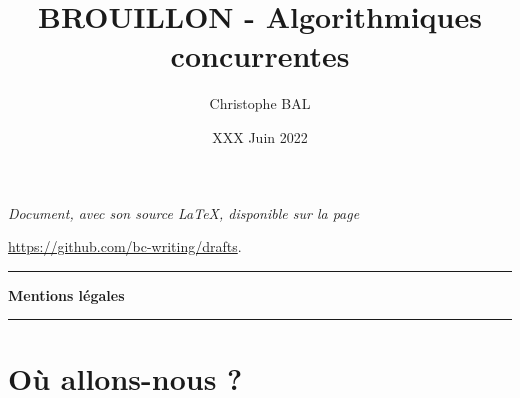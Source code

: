 \documentclass{amsbook}
\begin{document}
\title{BROUILLON - Algorithmiques concurrentes}
\author{Christophe BAL}
\date{XXX Juin 2022}

\maketitle

\begin{center}
    \itshape
    Document, avec son source \LaTeX, disponible sur la page
    
    \url{https://github.com/bc-writing/drafts}.
\end{center}


\bigskip


\begin{center}
    \hrule\vspace{.3em}
    {
        \fontsize{1.35em}{1em}\selectfont
        \textbf{Mentions \og légales \fg}
    }
            
    \vspace{0.45em}
    \doclicenseThis
    \hrule
\end{center}


\vspace{4em}


\setcounter{tocdepth}{2}
\tableofcontents




\newpage
\chapter{Où allons-nous ?}




\end{document}
